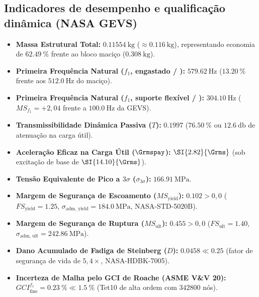 \begin{apendicesenv}
\section*{Indicadores de desempenho e qualificação dinâmica (NASA GEVS)}
\begin{itemize}
  \item \textbf{Massa Estrutural Total:} $\SI{0.11554}{\kilo\gram}$ ($\approx \SI{0.116}{\kilo\gram}$), representando economia de $\SI{62.49}{\percent}$ frente ao bloco maciço ($\SI{0.308}{\kilo\gram}$).
  \item \textbf{Primeira Frequência Natural ($f_1$, engastado / ):} $\SI{579.62}{\hertz}$ ($\SI{+13.20}{\percent}$ frente aos $\SI{512.0}{\hertz}$ do maciço).
  \item \textbf{Primeira Frequência Natural ($f_1$, suporte flexível / ):} $\SI{304.10}{\hertz}$ ($MS_{f_1} = +2{,}04$ frente a $\SI{100.0}{\hertz}$ da GEVS).
  \item \textbf{Transmissibilidade Dinâmica Passiva ($T$):} $\num{0.1997}$ ($\SI{76.50}{\percent}$ ou $\SI{12.6}{\decibel}$ de atenuação na carga útil).
  \item \textbf{Aceleração Eficaz na Carga Útil ($\Grmspay$):} $\SI{2.82}{\Grms}$ (sob excitação de base de $\SI{14.10}{\Grms}$).
  \item \textbf{Tensão Equivalente de Pico a $3\sigma$ ($\sigma_{3\sigma}$):} $\SI{166.91}{\mega\pascal}$.
  \item \textbf{Margem de Segurança de Escoamento ($MS_{\text{yield}}$):} $\num{+0.102} > 0{,}0$ ($FS_{\text{yield}} = \num{1.25}$, $\sigma_{\text{adm, yield}} = \SI{184.0}{\mega\pascal}$, NASA-STD-5020B).
  \item \textbf{Margem de Segurança de Ruptura ($MS_{\text{ult}}$):} $\num{+0.455} > 0{,}0$ ($FS_{\text{ult}} = \num{1.40}$, $\sigma_{\text{adm, ult}} = \SI{242.86}{\mega\pascal}$).
  \item \textbf{Dano Acumulado de Fadiga de Steinberg ($D$):} $\num{0.0458} \ll \num{0.25}$ (fator de segurança de vida de $5{,}4\times$, NASA-HDBK-7005).
  \item \textbf{Incerteza de Malha pelo GCI de Roache (ASME V\&V 20):} $GCI_{\text{fine}}^{f_1} = \SI{0.23}{\percent} \ll \SI{1.5}{\percent}$ (Tet10 de alta ordem com $\num{342800}$ nós).
\end{itemize}

\end{apendicesenv}
